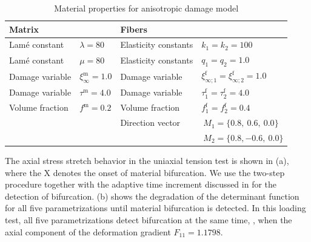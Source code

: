 \documentclass[12pt]{article}
\newcommand{\mtrx}{{\text{m}}}
\newcommand{\fiber}{{\text{f}}}
\numberwithin{equation}{section}
\begin{document}
\begin{table}[htbp]
  \begin{center}
    \begin{tabular}{ l l l l }
      \toprule
      Matrix
      &

      &

      Fibers

      &
      \\
      \midrule
      Lam\'{e} constant
      &
      $\lambda=80$
      &
      Elasticity constants
      &
      $k_1 = k_2 = 100$
      \\
      Lam\'{e} constant
      &
      $\mu = 80$
      &
      Elasticity constants
      &
      $q_1 = q_2 = 1.0$
      \\
      Damage variable
      &
      $\xi^\mtrx_\infty = 1.0$
      &
      Damage variable
      &
      $\xi^\fiber_{\infty;1} = \xi^\fiber_{\infty;2} = 1.0$
      \\
      Damage variable
      &
      $\tau^\mtrx = 4.0$
      &
      Damage variable
      &
      $\tau^\fiber_1 = \tau^\fiber_2 = 4.0$
      \\
      Volume fraction
      &
      $f^\mtrx = 0.2$
      &
      Volume fraction
      &
      $f^\fiber_1 = f^\fiber_2 = 0.4$
      \\
      &

      &
      Direction vector
      &
      $~M_1 = \{ 0.8,~0.6,~0.0\}$
      \\
      &

      &

      &
      $~M_2 = \{ 0.8,-0.6,~0.0\}$
      \\
      \bottomrule
    \end{tabular}
    \caption{Material properties for anisotropic damage model}
    \label{tab:aniso_material}
  \end{center}
\end{table}

The axial stress \vs stretch behavior in the uniaxial tension test is
shown in (a), where the X denotes the
onset of material bifurcation. We use the two-step procedure together
with the adaptive time increment discussed in  for
the detection of bifurcation. (b) shows
the degradation of the determinant function for all five
parametrizations until material bifurcation is detected. In this
loading test, all five parametrizations detect bifurcation at the same
time, \ie, when the axial component of the deformation gradient
$F_{11} = 1.1798$.
\end{document}

